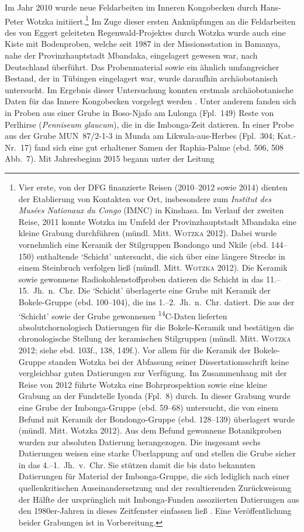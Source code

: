 Im Jahr 2010 wurde neue Feldarbeiten im Inneren Kongobecken durch Hans-Peter Wotzka initiiert.\footnote{Vier erste, von der DFG finanzierte Reisen (2010--2012 sowie 2014) dienten der Etablierung von Kontakten vor Ort, insbesondere zum \textit{Institut des Musées Nationaux du Congo} (IMNC) in Kinshasa. Im Verlauf der zweiten Reise, 2011 konnte Wotzka im Umfeld der Provinzhauptstadt Mbandaka eine kleine Grabung durchführen (mündl. Mitt. \textsc{Wotzka} 2012). Dabei wurde vornehmlich eine Keramik der Stilgruppen Bondongo \parencite[128--139]{Wotzka.1995} und Nkile (ebd. 144--150) enthaltende \enquote*{Schicht} untersucht, die sich über eine längere Strecke in einem Steinbruch verfolgen ließ (mündl. Mitt. \textsc{Wotzka} 2012). Die Keramik sowie gewonnene Radiokohlenstoffproben datieren die Schicht in das 11.--15.~Jh.~n.~Chr. Die \enquote*{Schicht} überlagerte eine Grube mit Keramik der Bokele-Gruppe (ebd. 100--104), die ins 1.--2.~Jh.~n.~Chr. datiert. Die aus der \enquote*{Schicht} sowie der Grube gewonnenen \textsuperscript{14}C-Daten lieferten absolutchornologisch Datierungen für die Bokele-Keramik und bestätigen die chronologische Stellung der keramischen Stilgruppen (mündl. Mitt. \textsc{Wotzka} 2012; siehe ebd. 103f., 138, 149f.). Vor allem für die Keramik der Bokele-Gruppe standen Wotzka bei der Abfassung seiner Dissertationsschrift keine vergleichbar guten Datierungen zur Verfügung. Im Zusammenhang mit der Reise von 2012 führte Wotzka eine Bohrprospektion sowie eine kleine Grabung an der Fundstelle Iyonda (Fpl.~8) durch. In dieser Grabung wurde eine Grube der Imbonga-Gruppe (ebd. 59--68) untersucht, die von einem Befund mit Keramik der Bondongo-Gruppe (ebd. 128--139) überlagert wurde (mündl. Mitt. Wotzka 2012). Aus dem Befund gewonnene Botanikproben wurden zur absoluten Datierung herangezogen. Die insgesamt sechs Datierungen weisen eine starke Überlappung auf und stellen die Grube sicher in das 4.--1.~Jh.~v.~Chr. Sie stützen damit die bis dato bekannten Datierungen für Material der Imbonga-Gruppe, die sich lediglich nach einer quellenkritischen Auseinandersetzung und der resultierenden Zurückweisung der Hälfte der ursprünglich mit Imbonga-Funden assoziierten Datierungen aus den 1980er-Jahren in dieses Zeitfenster einfassen ließ \parencite[66f.]{Wotzka.1995}. Eine Veröffentlichung beider Grabungen ist in Vorbereitung.} Im Zuge dieser ersten Anknüpfungen an die Feldarbeiten des von Eggert geleiteten Regenwald-Projektes durch Wotzka wurde auch eine Kiste mit Bodenproben, welche seit 1987 in der Missionsstation in Bamanya, nahe der Provinzhauptstadt Mbandaka, eingelagert gewesen war, nach Deutschland überführt. Das Probenmaterial sowie ein ähnlich umfangreicher Bestand, der in Tübingen eingelagert war, wurde daraufhin archäobotanisch untersucht. Im Ergebnis dieser Untersuchung konnten erstmals archäobotanische Daten für das Innere Kongobecken vorgelegt werden \parencite{Kahlheber.2014}. Unter anderem fanden sich in Proben aus einer Grube in Boso-Njafo am Lulonga (Fpl.~149) Reste von Perlhirse (\textit{Penniseum glaucum}), die in die Imbonga-Zeit datieren. In einer Probe aus der Grube MUN~87/2-1-3 in Munda am Likwala-aus-Herbes (Fpl.~304; Kat.-Nr.~17) fand sich eine gut erhaltener Samen der Raphia-Palme (ebd. 506, 508 Abb.~7). Mit Jahresbeginn 2015 begann unter der Leitung 